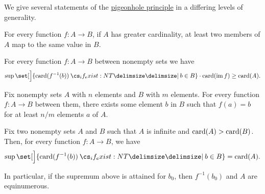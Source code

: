 \begin{theorem}\label{thm:pigeonhole_principle}
  We give several statements of the \hyperref[rem:pigeonhole_principle]{pigeonhole principle} in a differing levels of generality.

  \begin{thmenum}
     For every function \( f: A \to B \), if \( A \) has greater cardinality, at least two members of \( A \) map to the same value in \( B \).

     For every function \( f: A \to B \) between nonempty sets we have
    \begin{equation}\label{eq:thm:pigeonhole_principle/general}
      \sup\set[\Big]{ \card(f^{-1}(b)) \given* b \in B } \cdot \card(\img f) \geq \card(A).
    \end{equation}

     Fix nonempty  sets \( A \) with \( n \) elements and \( B \) with \( m \) elements. For every function \( f: A \to B \) between them, there exists some element \( b \) in \( B \) such that \( f(a) = b \) for at least \( n / m \) elements \( a \) of \( A \).

     Fix two nonempty sets \( A \) and \( B \) such that \( A \) is infinite and \( \operatorname{card}(A) > \operatorname{card}(B) \). Then, for every function \( f: A \to B \), we have
    \begin{equation}\label{eq:thm:pigeonhole_principle/infinitary}
      \sup\set[\Big]{ \card(f^{-1}(b)) \given* b \in B } = \card(A).
    \end{equation}

    In particular, if the supremum above is attained for \( b_0 \), then \( f^{-1}(b_0) \) and \( A \) are equinumerous.
  \end{thmenum}
\end{theorem}
